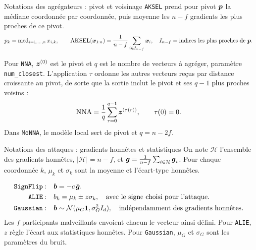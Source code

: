 \begin{frame}{Notations des agrégateurs : pivot et voisinage}
    \small
    \texttt{AKSEL} prend pour pivot $\boldsymbol{p}$ la médiane coordonnée par
    coordonnée, puis moyenne les $n-f$ gradients les plus proches de ce pivot.
    \[
        p_k=\operatorname{med}_{i=1,\ldots,n}x_{i,k},
        \qquad
        \operatorname{AKSEL}(\boldsymbol{x}_{1:n})=
        \frac{1}{n-f}\sum_{i\in I_{n-f}}\boldsymbol{x}_i,
        \quad I_{n-f}=\text{indices les plus proches de }\boldsymbol{p}.
    \]

    \medskip
    Pour \texttt{NNA}, $\boldsymbol{z}^{(0)}$ est le pivot et $q$ est le nombre
    de vecteurs à agréger, paramètre \texttt{num\_closest}. L'application
    $\tau$ ordonne les autres vecteurs reçus par distance croissante au pivot,
    de sorte que
    la sortie inclut le pivot et ses $q-1$ plus proches voisins :
    \[
        \operatorname{NNA}=\frac{1}{q}\sum_{r=0}^{q-1}
        \boldsymbol{z}^{(\tau(r))},
        \qquad \tau(0)=0.
    \]
    Dans \texttt{MoNNA}, le modèle local sert de pivot et $q=n-2f$.
\end{frame}

\begin{frame}{Notations des attaques : gradients honnêtes et statistiques}
    \small
    On note $\mathcal{H}$ l'ensemble des gradients honnêtes,
    $|\mathcal{H}|=n-f$, et
    $\bar{\boldsymbol{g}}=\frac{1}{n-f}\sum_{i\in\mathcal{H}}\boldsymbol{g}_i$.
    Pour chaque coordonnée $k$, $\mu_k$ et $\sigma_k$ sont la moyenne et
    l'écart-type honnêtes.

    \begin{align*}
        \texttt{SignFlip}:\quad
        & \boldsymbol{b}=-c\,\bar{\boldsymbol{g}}.
        \\
        \texttt{ALIE}:\quad
        & b_k=\mu_k\pm z\sigma_k,
          \quad\text{avec le signe choisi pour l'attaque.}
        \\
        \texttt{Gaussian}:\quad
        & \boldsymbol{b}\sim\mathcal{N}(\mu_G\boldsymbol{1},\sigma_G^2 I_d),
          \quad\text{indépendamment des gradients honnêtes.}
    \end{align*}
    Les $f$ participants malveillants envoient chacun le vecteur ainsi défini.
    Pour \texttt{ALIE}, $z$ règle l'écart aux statistiques honnêtes. Pour
    \texttt{Gaussian}, $\mu_G$ et $\sigma_G$ sont les paramètres du bruit.
\end{frame}


